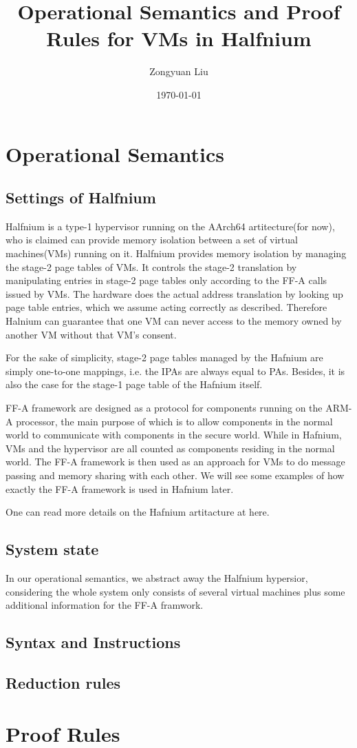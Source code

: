 \documentclass[a4paper]{article}
\title{Operational Semantics and Proof Rules for VMs in Halfnium}
\date{\today}
\author{Zongyuan Liu}
\begin{document}
\maketitle

\section{Operational Semantics}

\subsection{Settings of Halfnium}
Halfnium is a type-1 hypervisor running on the AArch64 artitecture(for now), who is claimed can provide memory isolation between a set of virtual machines(VMs) running on it.
Halfnium provides memory isolation by managing the stage-2 page tables of VMs. It controls the stage-2 translation by manipulating entries in stage-2 page tables only according to the FF-A calls issued by VMs. The hardware does the actual address translation by looking up page table entries, which we assume acting correctly as described. Therefore Halnium can guarantee that one VM can never access to the memory owned by another VM without that VM's consent.

For the sake of simplicity, stage-2 page tables managed by the Hafnium are simply one-to-one mappings, i.e. the IPAs are always equal to PAs. Besides, it is also the case for the stage-1 page table of the Hafnium itself.

FF-A framework are designed as a protocol for components running on the ARM-A processor, the main purpose of which is to allow components in the normal world to communicate with components in the secure world. While in Hafnium, VMs and the hypervisor are all counted as components residing in the normal world. The FF-A framework is then used as an approach for VMs to do message passing and memory sharing with each other. We will see some examples of how exactly the FF-A framework is used in Hafnium later.

One can read more details on the Hafnium artitacture at here.


\subsection{System state}
In our operational semantics, we abstract away the Halfnium hypersior, considering the whole system only consists of several virtual machines plus some additional information for the FF-A framwork.

\subsection{Syntax and Instructions}

\subsection{Reduction rules}



\section{Proof Rules}
\end{document}
